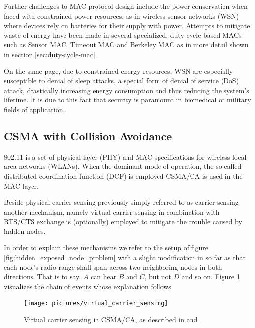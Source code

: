 Further challenges to MAC protocol design include the power conservation when faced with constrained power resources, as in wireless sensor networks (WSN) where devices rely on batteries for their supply with power. Attempts to mitigate waste of energy have been made in several specialized, duty-cycle based MACs such as Sensor MAC, Timeout MAC and Berkeley MAC as in more detail shown in section \ref{sec:duty-cycle-mac}.

On the same page, due to constrained energy resources, WSN are especially susceptible to denial of sleep attacks, a special form of denial of service (DoS) attack, drastically increasing energy consumption and thus reducing the system's lifetime. It is due to this fact that security is paramount in biomedical or military fields of application \cite{raymond09}. 

\subsection{CSMA with Collision Avoidance}

802.11 is a set of physical layer (PHY) and MAC specifications for wireless local area networks (WLANs). When the dominant mode of operation, the so-called distributed coordination function (DCF) is employed CSMA/CA is used in the MAC layer.

Beside physical carrier sensing previously simply referred to as carrier sensing another mechanism, namely virtual carrier sensing in combination with RTS/CTS exchange is (optionally) employed to mitigate the trouble caused by hidden nodes. 

In order to explain these mechanisms we refer to the setup of figure \ref{fig:hidden_exposed_node_problem} with a slight modification in so far as that each node's radio range shall span across two neighboring nodes in both directions. That is to say, $A$ can hear $B$ and $C$, but not $D$ and so on. Figure \ref{fig:virtual_carrier_sensing} visualizes the chain of events whose explanation follows.

\begin{figure}[tb]
	\label{fig:virtual_carrier_sensing}
	\begin{center}
		\texttt{[image: pictures/virtual\_carrier\_sensing]}
	\end{center}
	\caption{Virtual carrier sensing in CSMA/CA, as described in \cite{Tanenbaum02} and \cite{Gast05}}
\end{figure}


